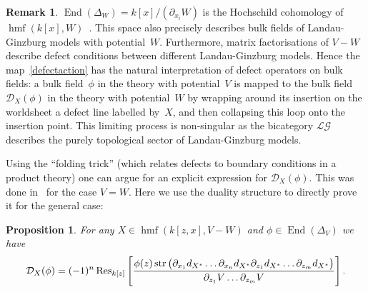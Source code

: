 \documentclass{compositio}
\newtheorem{proposition}[theorem]{Proposition}
\theoremstyle{definition}
\newtheorem{remark}[theorem]{Remark}
\numberwithin{equation}{section}
\DeclareMathOperator{\End}{End}
\DeclareMathOperator{\str}{str}
\DeclareMathOperator{\hmf}{hmf}
\begin{document}
\begin{remark}
$\End(\Delta_W) = k[x]/(\partial_{x_i}W)$ is the Hochschild cohomology of $\hmf(k[x], W)$~\cite{d0904.4713}. This space also precisely describes bulk fields of Landau-Ginzburg models with potential~$W$. Furthermore, matrix factorisations of $V-W$ describe defect conditions between different Landau-Ginzburg models. Hence the map~\eqref{defectaction} has the natural interpretation of defect operators on bulk fields: a bulk field~$\phi$ in the theory with potential~$V$ is mapped to the bulk field $\mathcal D_X(\phi)$ in the theory with potential~$W$ by wrapping around its insertion on the worldsheet a defect line labelled by~$X$, and then collapsing this loop onto the insertion point. This limiting process is non-singular as the bicategory $\mathcal{LG}$ describes the purely topological sector of Landau-Ginzburg models. 
\end{remark}

Using the ``folding trick'' (which relates defects to boundary conditions in a product theory) one can argue for an explicit expression for $\mathcal D_X(\phi)$. This was done in~\cite{cr1006.5609} for the case $V=W$. Here we use the duality structure to directly prove it for the general case: 

\begin{proposition}
For any $X\in \hmf(k[z,x], V-W)$ and $\phi\in \End(\Delta_V)$ we have
$$
\mathcal D_X(\phi) = (-1)^n \Res_{k[z]} \left[ \frac{\phi(z) \str\big( \partial_{x_1} d_{X^*}\ldots \partial_{x_n} d_{X^*} \partial_{z_1} d_{X^*}\ldots \partial_{z_m} d_{X^*} \big)}{\partial_{z_1} V \ldots \partial_{z_m} V} \right] . 
$$
\end{proposition}
\end{document}
